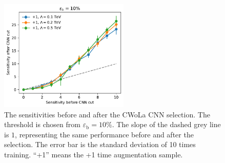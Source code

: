 \documentclass[12pt]{article}
\begin{document}
        \begin{figure}[htpb]
            \centering
            \includegraphics[width=0.55\textwidth]{HVmodel_sensitivity_improvement_bkg_eff_10_aug_1_std_01_02_05.pdf}
            \caption{The sensitivities before and after the CWoLa CNN selection. The threshold is chosen from $\varepsilon_{\text{b}} = 10\%$. The slope of the dashed grey line is $1$, representing the same performance before and after the selection. The error bar is the standard deviation of 10 times training. ``+1'' means the +1 time augmentation sample.}
            \label{fig:sensitivity_improvement_bkg_eff_01_smearing_scale}
        \end{figure}
\end{document}
